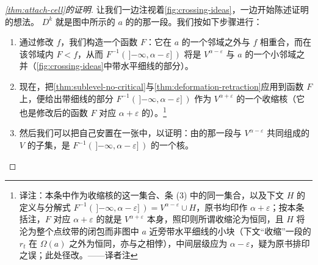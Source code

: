 \begin{proof}[\cref{thm:attach-cell}的证明]
让我们一边注视着\cref{fig:crossing-ideas}，一边开始陈述证明的想法。\trCellular{} $D^k$ 就是图中所示的 $a$ 的\trUnstableManifold{}的那一段。我们按如下步骤进行：
\begin{enumerate}[label=(\arabic*)]
\item 通过修改 $f$，我们构造一个函数 $F$：它在 $a$ 的一个邻域之外与 $f$ 相重合，而在该邻域内 $F<f$，从而 $F^{-1}(\,]{-\infty},\alpha-\varepsilon]\,)$ 将是 $V^{\alpha-\varepsilon}$ 与 $a$ 的一个小邻域之并（\cref{fig:crossing-ideas}中带水平细线的部分）。
\item 现在，把\cref{thm:sublevel-no-critical}与\cref{thm:deformation-retraction}应用到函数 $F$ 上，便给出带细线的部分 $F^{-1}(\,]{-\infty},\alpha-\varepsilon]\,)$ 作为 $V^{\alpha+\varepsilon}$ 的一个收缩核（它也是修改后的函数 $F$ 对应 $\alpha+\varepsilon$ 的\trSublevelSet）。\footnote{译注：本条中作为收缩核的这一集合、条 (3) 中的同一集合，以及下文 $H$ 的定义与分解式 $F^{-1}(\,]{-\infty},\alpha-\varepsilon]\,)=V^{\alpha-\varepsilon}\cup H$，原书均印作 $\alpha+\varepsilon$；按本条括注，$F$ 对应 $\alpha+\varepsilon$ 的\trSublevelSet{}就是 $V^{\alpha+\varepsilon}$ 本身，照印则所谓收缩沦为恒同，且 $H$ 将沦为整个点纹带的闭包而非图中 $a$ 近旁带水平细线的小块（下文“收缩”一段的 $r_t$ 在 $\Omega(a)$ 之外为恒同，亦与之相悖），中间层级应为 $\alpha-\varepsilon$，疑为原书排印之误；此处径改。——译者注}
\item 然后我们可以把自己安置在一张\trMorseChart{}中，以证明：由\trUnstableManifold{}的那一段与 $V^{\alpha-\varepsilon}$ 共同组成的 $V$ 的子集，是 $F^{-1}(\,]{-\infty},\alpha-\varepsilon]\,)$ 的一个\trDeformationRetract{}核。
\end{enumerate}


\end{proof}
